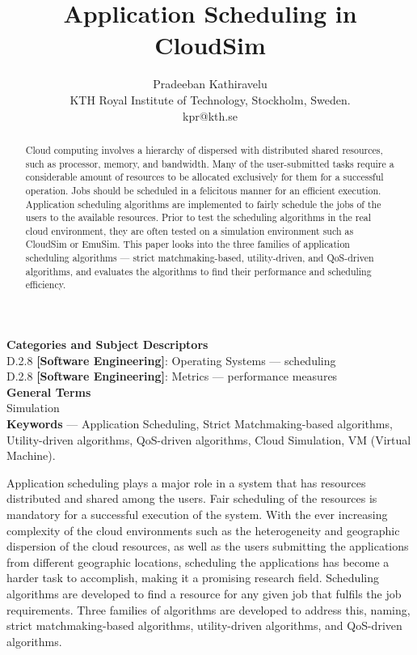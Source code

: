 \documentclass[times, 10pt,twocolumn]{article}
\begin{document}
\title{Application Scheduling in CloudSim}

\author{Pradeeban Kathiravelu\\
KTH Royal Institute of Technology, Stockholm, Sweden.\\ kpr@kth.se\\
}

\maketitle
\thispagestyle{empty}

\begin{abstract}
   Cloud computing involves a  hierarchy of dispersed with distributed shared resources, such as processor, memory, and bandwidth. Many of the user-submitted tasks require a considerable amount of resources to be allocated exclusively for them for a successful operation. Jobs should be scheduled in a felicitous manner for an efficient execution. Application scheduling algorithms are implemented to fairly schedule the jobs of the users to the available resources. Prior to test the scheduling algorithms in the real cloud environment, they are often tested on a simulation environment such as CloudSim or EmuSim. This paper looks into the three families of application scheduling algorithms --- strict matchmaking-based, utility-driven, and QoS-driven algorithms, and evaluates the algorithms to find their performance and scheduling efficiency. 
\end{abstract}


\textbf{Categories and Subject Descriptors}\\
D.2.8 \textbf{[Software Engineering]}: Operating Systems --- scheduling\\
D.2.8 \textbf{[Software Engineering]}: Metrics --- performance measures\\
\textbf{General Terms}\\
Simulation\\
\textbf{Keywords} ---  Application Scheduling, Strict Matchmaking-based algorithms, Utility-driven algorithms, QoS-driven algorithms, Cloud Simulation, VM (Virtual Machine).


Application scheduling plays a major role in a system that has resources distributed and shared among the users. Fair scheduling of the resources is mandatory for a successful execution of the system. With the ever increasing complexity of the cloud environments such as the heterogeneity and geographic dispersion of the cloud resources, as well as the users submitting the applications from different geographic locations, scheduling the applications has become a harder task to accomplish, making it a promising research field. Scheduling algorithms are developed to find a resource for any given job that fulfils the job requirements. Three families of algorithms are developed to address this, naming, strict matchmaking-based algorithms, utility-driven algorithms, and QoS-driven algorithms.
\end{document}
